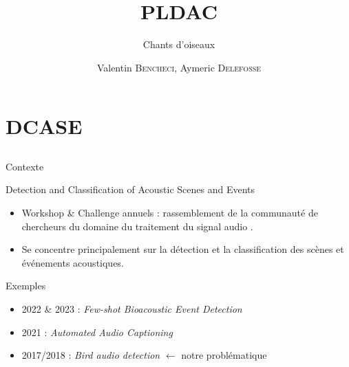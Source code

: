 \documentclass[compress,xcolor=table]{beamer}
\title{PLDAC}
\subtitle{Chants d'oiseaux} %
\date{\formatdate{25}{05}{2023}}
\author{Valentin \textsc{Bencheci}, Aymeric \textsc{Delefosse}}
\institute{Master DAC - Sorbonne Université} %
\begin{document}
\begin{frame}[plain]
    \titlepage
    \setcounter{framenumber}{0}
\end{frame}


\section{DCASE} \subsection{}

\begin{frame}{Contexte}

    \begin{block}{Detection and Classification of Acoustic Scenes and Events}

        \begin{itemize}
            \item
                  Workshop \& Challenge annuels : rassemblement de la communauté de chercheurs du domaine du traitement du signal audio .
            \item
                  Se concentre principalement sur la détection et la classification des scènes et événements acoustiques.
        \end{itemize}

    \end{block}

    \begin{exampleblock}{Exemples}
        \begin{itemize}
            \item
                  2022 \& 2023 : \textit{Few-shot Bioacoustic Event Detection}
            \item
                  2021 : \textit{Automated Audio Captioning}
            \item
                  2017/2018 : \textit{Bird audio detection} $\leftarrow$ notre problématique
        \end{itemize}
    \end{exampleblock}

\end{frame}
\end{document}
